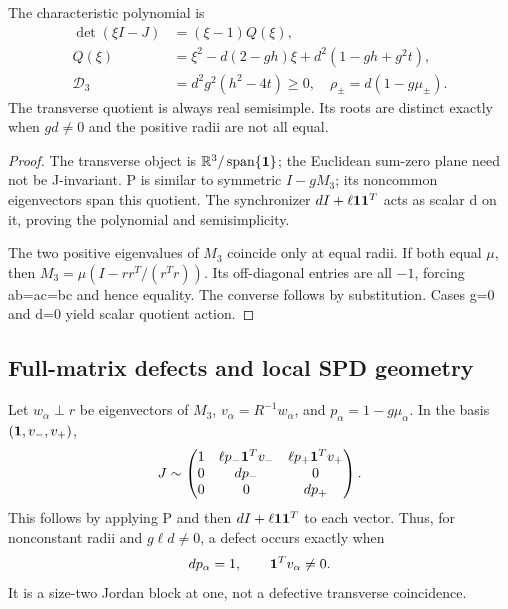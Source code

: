 \begin{theorem}\label{thm:triad}
The characteristic polynomial is
\begin{align}
\det(\xi I-J)&=(\xi-1)Q(\xi),\\
Q(\xi)&=\xi^2-d(2-gh)\xi+d^2(1-gh+g^2t),\label{eq:triadpoly}\\
\mathcal D_3&=\boxed{d^2g^2(h^2-4t)\ge0},\quad
\rho_\pm=d(1-g\mu_\pm).\label{eq:triadD}
\end{align}
The transverse quotient is always real semisimple. Its roots are distinct exactly when \(gd\ne0\) and the positive radii are not all equal.
\end{theorem}
\begin{proof}
The transverse object is \(\mathbb R^3/\operatorname{span}\{\mathbf1\}\); the Euclidean sum-zero plane need not be J-invariant. P is similar to symmetric \(I-gM_3\); its noncommon eigenvectors span this quotient. The synchronizer \(dI+\ell\mathbf1\mathbf1^T\) acts as scalar d on it, proving the polynomial and semisimplicity.

The two positive eigenvalues of \(M_3\) coincide only at equal radii. If both equal \(\mu\), then \(M_3=\mu(I-rr^T/(r^Tr))\). Its off-diagonal entries are all \(-1\), forcing ab=ac=bc and hence equality. The converse follows by substitution. Cases g=0 and d=0 yield scalar quotient action.
\end{proof}

\subsection{Full-matrix defects and local SPD geometry}
Let \(w_\alpha\perp r\) be eigenvectors of \(M_3\), \(v_\alpha=R^{-1}w_\alpha\), and \(p_\alpha=1-g\mu_\alpha\). In the basis \((\mathbf1,v_-,v_+)\),
\begin{equation}
J\sim
\begin{pmatrix}
1&\ell p_-\mathbf1^Tv_-&\ell p_+\mathbf1^Tv_+\\
0&dp_-&0\\0&0&dp_+
\end{pmatrix}.\label{eq:triadres}
\end{equation}
This follows by applying P and then \(dI+\ell\mathbf1\mathbf1^T\) to each vector. Thus, for nonconstant radii and \(g\ell d\ne0\), a defect occurs exactly when
\begin{equation}
dp_\alpha=1,\qquad \mathbf1^Tv_\alpha\ne0.\label{eq:resonance}
\end{equation}
It is a size-two Jordan block at one, not a defective transverse coincidence.


